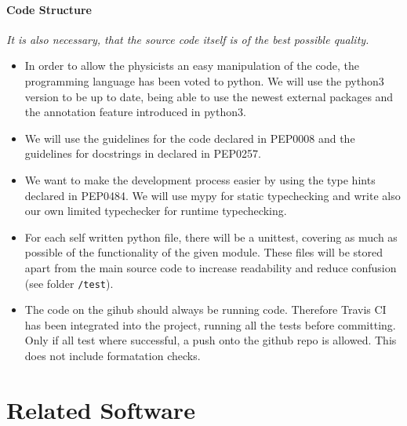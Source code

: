 \documentclass[a4paper,12pt]{article}
\begin{document}
\paragraph{Code Structure}
\textit{It is also necessary, that the source code itself is of the best possible quality.}
\begin{itemize} \itemsep-0.5pt
 \item In order to allow the physicists an easy manipulation of the code, the programming language has been voted to python. We will use the python3 version to be up to date, being able to use the newest external packages and the annotation feature introduced in python3.
 \item We will use the guidelines for the code declared in PEP0008 and the guidelines for docstrings in declared in PEP0257.
 \item We want to make the development process easier by using the type hints declared in PEP0484. We will use mypy for static typechecking and write also our own limited typechecker for runtime typechecking.
 \item For each self written python file, there will be a unittest, covering as much as possible of the functionality of the given module. These files will be stored apart from the main source code to increase readability and reduce confusion (see folder \texttt{/test}).
 \item The code on the gihub should always be running code. Therefore Travis CI has been integrated into the project, running all the tests before committing. Only if all test where successful, a push onto the github repo is allowed. This does not include formatation checks.
\end{itemize}


\section{Related Software}
\end{document}
